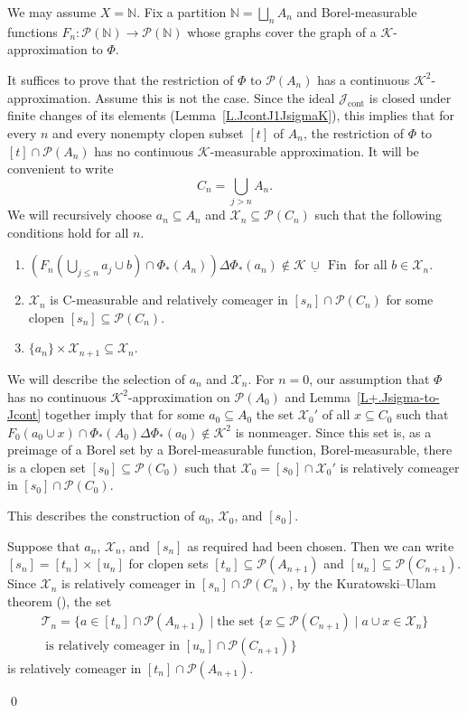 \documentclass{amsart}
\makeatletter
\def\Fin{{\rm Fin}}   %
\def\text{\mbox}
\theoremstyle{definition}
\theoremstyle{remark}
\newcommand{\ucup}{\,\underline{\cup}\,}
\def\Fin{\operatorname{Fin}}
\DeclareMathOperator{\Ccont}{cont}
\newcommand{\Jcont}{\cJ_{\Ccont}}
\newcommand{\cK}{{\mathcal K}}
\renewcommand{\proofname}{Proof}
\renewenvironment{proof}[1][\proofname]{\par
\let\oldqedsymbol\qedsymbol             %
  \normalfont
  \topsep6\p@\@plus6\p@ \trivlist
  \item[\hskip\labelsep\hskip\parindent\scshape
    #1\@addpunct{.}]\ignorespaces
}{%
  \qed\endtrivlist
\global\let\qedsymbol\oldqedsymbol      %
}
\newcommand{\cP}{\mathcal P}
\newcommand{\bbN}{\mathbb N}
\newcommand{\cJ}{{\mathcal J}} %
\newcommand{\cT}{\mathcal T}
\newcommand{\cX}{\mathcal X}
\numberwithin{claim}{subsection}
\makeatother
\begin{document}
\begin{proof}[Proof of Proposition~\ref{P+.Jsigma-to-Jcont}]We may assume $X=\bbN$. 	Fix a partition $\bbN=\bigsqcup_n A_n$ and Borel-mea\-su\-ra\-ble functions $F_n\colon \cP(\bbN)\to \cP(\bbN)$ whose graphs cover the graph of a $\cK$-ap\-proxi\-ma\-ti\-on to $\Phi$. 
	
	It suffices to prove that the restriction of $\Phi$ to $\cP(A_n)$ has a continuous $\cK^2$-approximation. Assume this is not the case. Since the ideal $\Jcont$ is closed under finite changes of its elements (Lemma~\ref{L.JcontJ1JsigmaK}), this implies that for every $n$ and every nonempty clopen subset $[t]$ of $A_n$, the restriction of $\Phi$  to $[t]\cap \cP(A_n)$ has no continuous $\cK$-measurable approximation. 
		It will be convenient to write 
	\[
	\textstyle	C_n=\bigcup_{j>n}A_n.	
	\]
	We will recursively choose $a_n\subseteq A_n$ and  $\cX_n\subseteq \cP(C_n)$ such that the following conditions hold for all $n$. 
	\begin{enumerate}[label = (\roman*)]
		\item\label{I+.sigma-Borel.1}  $(F_n(\bigcup_{j\leq n} a_j\cup b)\cap \Phi_*(A_n))\Delta  \Phi_*(a_n)\notin \cK\ucup\Fin$ for all $b\in \cX_n$.  
		\item $\cX_n$ is C-measurable and relatively comeager in $[s_n]\cap \cP(C_n)$ for some clopen $[s_n]\subseteq \cP(C_n)$. 
		\item $\{a_n\}\times \cX_{n+1}\subseteq \cX_n$. 
	\end{enumerate}
	We will describe the selection of $a_n$ and $\cX_n$. 
	For $n=0$, our assumption that $\Phi$ has no continuous $\cK^2$-approximation on $\cP(A_0)$ and Lemma~\ref{L+.Jsigma-to-Jcont} together imply that for some $a_0\subseteq A_0$ the set $\cX_0'$ of all $x\subseteq C_0$ such that $F_0(a_0\cup x)\cap \Phi_*(A_0)\Delta \Phi_*(a_0)\notin \cK^2$ is nonmeager. 
	Since this set is, as a preimage of a Borel set by a Borel-measurable function, Borel-measurable, there is a clopen set $[s_0]\subseteq \cP(C_0)$ such that $\cX_0=[s_0]\cap \cX_0'$ is relatively comeager in $[s_0]\cap \cP(C_0)$. 
	
	This describes the construction of $a_0$, $\cX_0$, and $[s_0]$. 
	
	Suppose that $a_n$, $\cX_n$, and $[s_n]$ as required had been chosen. 
	Then we can write $[s_n]=[t_n]\times [u_n]$ for clopen sets $[t_n]\subseteq \cP(A_{n+1})$ and $[u_n]\subseteq \cP(C_{n+1})$. Since $\cX_n$ is relatively comeager in $[s_n]\cap \cP(C_n)$,  by the Kuratowski--Ulam theorem (\cite[\S 8.K]{Ke:Classical}), the set 
	\begin{multline*}
		\cT_n=\{a\in [t_n]\cap \cP(A_{n+1})\mid \text{the set }\{x\subseteq \cP(C_{n+1})\mid  a\cup x\in \cX_n\}\\ \text{ is relatively comeager in $[u_n]\cap \cP(C_{n+1})$}\}
	\end{multline*}
	is relatively comeager in $[t_n]\cap \cP(A_{n+1})$. 
	

\end{proof}
\end{document}
